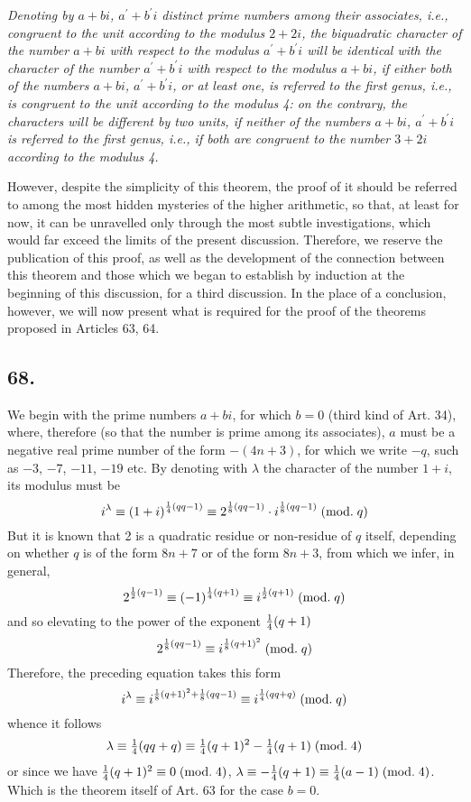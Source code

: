 \documentclass[twoside,12pt, showframe]{memoir}
\renewcommand{\pmod}[1]{\;(\textrm{mod.}\;#1)}
\let\oldfrac\frac
\def\frac#1#2{\mathchoice{\tfrac{#1}{#2}}{\oldfrac{#1}{#2}}{\genfrac{}{}{}{2}{#1}{#2\mathstrut}}{\genfrac{}{}{}{3}{#1}{#2\mathstrut}}}
\begin{document}
\textit{Denoting by \(a+bi\), \(a^{\prime}+b^{\prime}i\) distinct prime numbers among their associates, i.e., congruent to the unit according to the modulus \(2+2i\), the biquadratic character of the number \(a+bi\) with respect to the modulus \(a^{\prime}+b^{\prime}i\) will be identical with the character of the number \(a^{\prime}+b^{\prime}i\) with respect to the modulus \(a+bi\), if either both of the numbers \(a+bi\), \(a^{\prime}+b^{\prime}i\), or at least one, is referred to the first genus, i.e., is congruent to the unit according to the modulus 4: on the contrary, the characters will be different by two units, if neither of the numbers \(a+bi\), \(a^{\prime}+b^{\prime}i\) is referred to the first genus, i.e., if both are congruent to the number \(3+2i\) according to the modulus 4.}\clearpage\noindent

However, despite the simplicity of this theorem, the proof of it should be referred to among the most hidden mysteries of the higher arithmetic, so that, at least for now, it can be unravelled only through the most subtle investigations, which would far exceed the limits of the present discussion. Therefore, we reserve the publication of this proof, as well as the development of the connection between this theorem and those which we began to establish by induction at the beginning of this discussion, for a third discussion. In the place of a conclusion, however, we will now present what is required for the proof of the theorems proposed in Articles 63, 64.
%

\subsection*{68.}

We begin with the prime numbers \(a+b i\), for which \(b=0\) (third kind of Art. 34), where, therefore (so that the number is prime among its associates), \(a\) must be a negative real prime number of the form \(-(4n+3)\), for which we write \(-q\), such as \(-3\), \(-7\), \(-11\), \(-19\) etc. By denoting with \(\lambda\) the character of the number \(1+i\), its modulus must be
\[i^{\lambda} \equiv (1+i)^{\frac{1}{4}(qq-1)} \equiv 2^{\frac{1}{8}(qq-1)} \cdot i^{\frac{1}{8}(qq-1)}\pmod{q}\]
But it is known that 2 is a quadratic residue or non-residue of \(q\) itself, depending on whether \(q\) is of the form \(8n+7\) or of the form \(8n+3\), from which we infer, in general,
\[2^{\frac{1}{2}(q-1)} \equiv (-1)^{\frac{1}{4}(q+1)} \equiv i^{\frac{1}{2}(q+1)}\pmod{q}\]
and so elevating to the power of the exponent \(\frac{1}{4}(q+1)\)
\[2^{\frac{1}{8}(qq-1)} \equiv i^{\frac{1}{8}(q+1)^{2}}\pmod{q}\]
Therefore, the preceding equation takes this form
\[i^{\lambda} \equiv i^{\frac{1}{8}(q+1)^{2}+\frac{1}{8}(qq-1)} \equiv i^{\frac{1}{4}(qq+q)}\pmod{q}\]
whence it follows
\[\lambda \equiv \frac{1}{4}(qq+q) \equiv \frac{1}{4}(q+1)^{2}-\frac{1}{4}(q+1)\pmod{4}\]
or since we have \(\frac{1}{4}(q+1)^{2} \equiv 0\pmod{4}\), \(\lambda \equiv -\frac{1}{4}(q+1) \equiv \frac{1}{4}(a-1)\pmod{4}\).
Which is the theorem itself of Art. 63 for the case \(b=0\).
%
\end{document}
